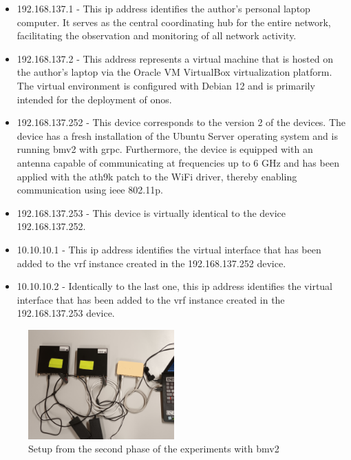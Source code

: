 \begin{itemize}
	\item 192.168.137.1 - This \gls{ip} address identifies the author's personal laptop computer. It serves as the central coordinating hub for the entire network, facilitating the observation and monitoring of all network activity.
	\item 192.168.137.2 - This address represents a virtual machine that is hosted on the author's laptop via the Oracle VM VirtualBox virtualization platform. The virtual environment is configured with Debian 12 and is primarily intended for the deployment of \gls{onos}.
	\item 192.168.137.252 - This device corresponds to the version 2 of the devices. The device has a fresh installation of the Ubuntu Server operating system and is running \gls{bmv2} with grpc. Furthermore, the device is equipped with an antenna capable of communicating at frequencies up to 6 GHz and has been applied with the ath9k patch to the WiFi driver, thereby enabling communication using \gls{ieee} 802.11p.
	\item 192.168.137.253 - This device is virtually identical to the device 192.168.137.252.
	\item 10.10.10.1 - This \gls{ip} address identifies the virtual interface that has been added to the \gls{vrf} instance created in the 192.168.137.252 device.
	\item 10.10.10.2 - Identically to the last one, this \gls{ip} address identifies the virtual interface that has been added to the \gls{vrf} instance created in the 192.168.137.253 device.
\end{itemize}

\begin{figure}
	\centering
	\includegraphics[width=0.5\textwidth]{Chapters/Figures/tests/bmv2_phase_2/20241122_193213.jpg}
	\caption{Setup from the second phase of the experiments with \gls{bmv2}}
	\label{fig:exp2_phase2_setup}
\end{figure}

